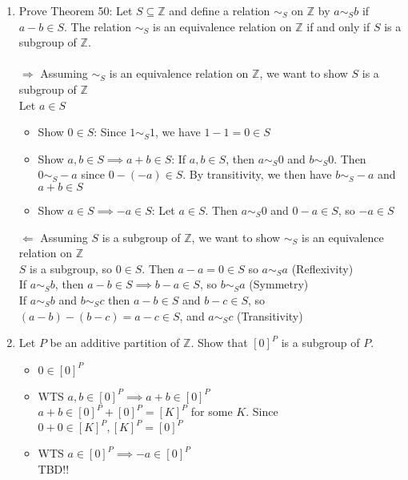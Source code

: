 \documentclass[11pt]{article}
\begin{document}
\begin{enumerate}
\newpage %
\item Prove Theorem 50: Let $S \subseteq \mathbb{Z}$ and define a relation $\sim_S$ on $\mathbb{Z}$ by $a \sim_S b$ if $a-b \in S$.  The relation $\sim_S$ is an equivalence relation on $\mathbb{Z}$ if and only if $S$ is a subgroup of $\mathbb{Z}$.\\
\\
$\Rightarrow$ Assuming $\sim_S$ is an equivalence relation on $\mathbb{Z}$, we want to show $S$ is a subgroup of $\mathbb{Z}$
\\
Let $a \in S$
\begin{itemize}
\item Show $0 \in S$: Since $1 \sim_S 1$, we have $1-1=0 \in S$
\item Show $a, b \in S \implies a + b \in S$:  If $a, b \in S$, then $a \sim_S 0$ and $b \sim_S 0$.  Then $0 \sim_S -a$ since $0 - (-a) \in S$.  By transitivity, we then have $b \sim_S -a$ and $a + b \in S$  
\item Show $a \in S \implies -a \in S$:  Let $a \in S$.  Then $a \sim_S 0$ and $0 - a \in S$, so $-a \in S$
\end{itemize}
$\Leftarrow$ Assuming $S$ is a subgroup of $\mathbb{Z}$, we want to show $\sim_S$ is an equivalence relation on $\mathbb{Z}$
\\
$S$ is a subgroup, so $0 \in S$.  Then $a - a = 0 \in S$ so $a \sim_S a$ (Reflexivity)
\\
If $a \sim_S b$, then $a - b \in S \implies b -a \in S$, so $b \sim_S a$ (Symmetry)
\\
If $a \sim_S b$ and $b \sim_S c$ then $a -b \in S$ and $b -c \in S$, so $(a -b) - (b -c) = a -c \in S$, and $a \sim_S c$ (Transitivity)
\newpage %
\item Let $P$ be an additive partition of $\mathbb{Z}$. Show that $[0]^P$ is a subgroup of $P$.
\\
\begin{itemize}
\item $0 \in [0]^P$
\item WTS $a,b \in [0]^P \implies a + b \in [0]^P$\\
$a + b \in [0]^P + [0]^P = [K]^P$ for some $K$.  Since $ 0 + 0 \in [K]^P, [K]^P = [0]^P$
\item WTS $a \in [0]^P \implies -a \in [0]^P$\\
TBD!!
\end{itemize}


\end{enumerate}
\end{document}
